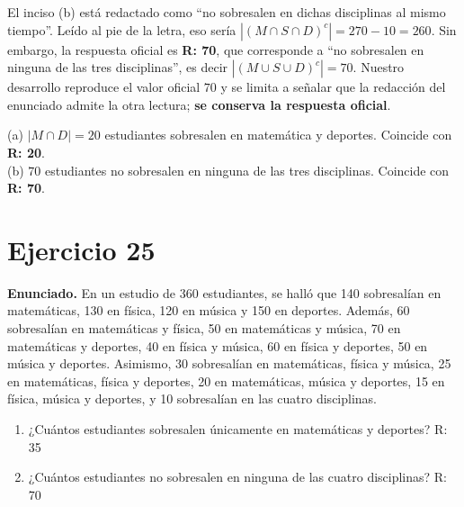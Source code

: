 \documentclass[11pt]{article}
\begin{document}
\begin{nota}
El inciso (b) est\'a redactado como ``no sobresalen en dichas disciplinas al mismo tiempo''. Le\'ido al pie de la letra, eso ser\'ia $|(M\cap S\cap D)^{c}| = 270-10 = 260$. Sin embargo, la respuesta oficial es \textbf{R: 70}, que corresponde a ``no sobresalen en ninguna de las tres disciplinas'', es decir $|(M\cup S\cup D)^{c}| = 70$. Nuestro desarrollo reproduce el valor oficial $70$ y se limita a se\~nalar que la redacci\'on del enunciado admite la otra lectura; \textbf{se conserva la respuesta oficial}.
\end{nota}

\begin{resp}
(a) $|M\cap D| = \boxed{20}$ estudiantes sobresalen en matem\'atica y deportes. Coincide con \textbf{R: 20}.\\
(b) $\boxed{70}$ estudiantes no sobresalen en ninguna de las tres disciplinas. Coincide con \textbf{R: 70}.
\end{resp}

\newpage

\section*{Ejercicio 25}

\textbf{Enunciado.} En un estudio de 360 estudiantes, se hall\'o que 140 sobresal\'ian en matem\'aticas, 130 en f\'isica, 120 en m\'usica y 150 en deportes. Adem\'as, 60 sobresal\'ian en matem\'aticas y f\'isica, 50 en matem\'aticas y m\'usica, 70 en matem\'aticas y deportes, 40 en f\'isica y m\'usica, 60 en f\'isica y deportes, 50 en m\'usica y deportes. Asimismo, 30 sobresal\'ian en matem\'aticas, f\'isica y m\'usica, 25 en matem\'aticas, f\'isica y deportes, 20 en matem\'aticas, m\'usica y deportes, 15 en f\'isica, m\'usica y deportes, y 10 sobresal\'ian en las cuatro disciplinas.
\begin{enumerate}[label=(\alph*),leftmargin=*]
\item ¿Cu\'antos estudiantes sobresalen \'unicamente en matem\'aticas y deportes? R: 35
\item ¿Cu\'antos estudiantes no sobresalen en ninguna de las cuatro disciplinas? R: 70
\end{enumerate}
\end{document}
